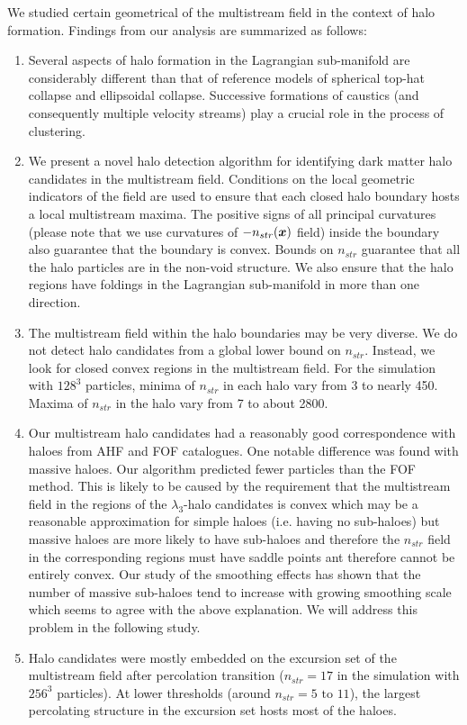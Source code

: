 \documentclass[fleqn,usenatbib,useAMS]{mnras}
\begin{document}
We studied certain geometrical of the multistream field in the context of halo formation. Findings from our analysis are summarized as follows: 

\begin{enumerate}

\item Several aspects of halo formation in the Lagrangian sub-manifold are considerably different than that of reference models of spherical top-hat collapse and ellipsoidal collapse. Successive formations of caustics (and consequently multiple velocity streams) play a crucial role in the process of clustering.

\item We present a novel halo detection algorithm for identifying dark matter halo candidates in the multistream field. Conditions on the local geometric indicators of the field are used to ensure that each closed halo boundary hosts a local multistream maxima. The 
positive signs of all principal curvatures  (please note that we use curvatures of $-n_{str}(\bmath{x})$ field) inside the boundary also guarantee that the boundary is convex. 
Bounds on $n_{str}$  guarantee that all the halo particles are in the non-void structure. We also ensure that the halo regions have foldings in the Lagrangian sub-manifold in more than one direction.  

\item The multistream field within the halo boundaries may be very diverse. We do not detect halo candidates from a global lower bound on $n_{str}$. Instead, we look for closed convex regions in the multistream field. For the simulation with $128^3$ particles, minima of $n_{str}$ in each halo vary from 3 to nearly 450. Maxima of $n_{str}$ in the halo vary from 7 to about 2800. 

\item Our multistream halo candidates had a reasonably good correspondence with haloes from AHF and FOF catalogues. One notable difference was found with massive haloes. Our algorithm predicted fewer particles than the FOF method. This is likely to be caused
by the requirement that the multistream field in the regions of the $\lambda_3$-halo candidates is convex  which may be a reasonable approximation  for simple haloes (i.e. having no sub-haloes) but massive haloes are more likely to have sub-haloes and therefore the $n_{str}$ field in the corresponding regions must have saddle points ant therefore cannot be entirely convex. Our study of the smoothing effects  has shown that the number of massive sub-haloes tend to increase with growing smoothing scale which seems to agree with the above explanation. We will address this problem in the following study.
  

\item Halo candidates were mostly embedded on the excursion set of the multistream field after percolation transition ($n_{str} = 17$ in the simulation with $256^3$ particles). At lower thresholds (around $n_{str} = 5 \text{ to } 11$), the largest percolating structure in the excursion set hosts most of the haloes.     

\end{enumerate}
\end{document}
